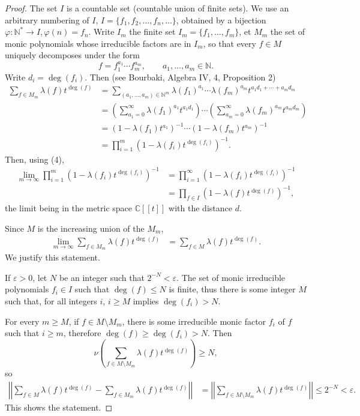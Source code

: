 \documentclass[11pt,a4paper]{article}
\newcommand{\N}{\mathbb{N}}
\newcommand{\C}{\mathbb{C}}
\begin{document}
\begin{proof}
The set $I$ is a countable set (countable union of finite sets). We use an arbitrary numbering of $I$, $I = \{f_1,f_2,\ldots,f_n,\ldots\}$, obtained by a bijection $\varphi : \N^* \to I, \varphi(n) =f_n$. Write $I_m$ the finite set $I_m = \{f_1,\ldots,f_m\}$, et $M_m$ the set of monic polynomials whose irreducible factors are in $I_m$, so that every $f \in M$  uniquely decomposes under the form
$$f = f_1^{a_1}\cdots f_m^{a_m}, \qquad a_1,\ldots,a_m \in \N.$$
Write $d_i = \deg(f_i)$. Then (see Bourbaki, Algebra IV, 4, Proposition 2)
\begin{align*}
\sum_{f \in M_m} \lambda(f) t^{\deg(f)} &= \sum_{(a_1,\ldots,a_m) \in \N^m} \lambda(f_1)^{a_1} \cdots \lambda(f_m)^{a_m} t^{a_1d_1+ \cdots+a_md_m}\\
&= \left(\sum_{a_1 = 0}^\infty \lambda(f_1)^{a_1} t^{a_1d_1} \right) \cdots \left(\sum_{a_m = 0}^\infty \lambda(f_m)^{a_m} t^{a_md_m} \right)\\
&= \left(1 - \lambda(f_1)t^{a_1} \right)^{-1} \cdots  \left(1 - \lambda(f_m)t^{a_m} \right)^{-1}\\
&=\prod_{i=1}^m \left( 1 - \lambda(f_i) t^{\deg(f_i)} \right)^{-1}.
\end{align*}
Then, using (4),
\begin{align*}
\lim_{m \to \infty} \prod_{i=1}^m \left( 1 - \lambda(f_i) t^{\deg(f_i)} \right)^{-1} &=\prod_{i=1}^\infty \left( 1 - \lambda(f_i) t^{\deg(f_i)} \right)^{-1} \\
&=\prod_{f \in I} (1 - \lambda(f) t^{\deg(f)})^{-1},
\end{align*}
the limit being in the metric space $\C[[t]]$ with the distance $d$.

Since $M$ is the increasing union of the $M_m$, 
\begin{align*}
\lim_{m\to \infty} \sum_{f \in M_m} \lambda(f) t^{\deg(f)}  &=  \sum_{f \in M} \lambda(f) t^{\deg(f)}.
\end{align*}
We justify this statement.

 If $\varepsilon >0$, let $N$ be an integer such that $2^{-N} < \varepsilon$. The set of monic irreducible polynomials $f_i \in I$ such that $\deg(f) \leq N$ is finite, thus there is some integer $M$ such that, for all integers $i$, $i \geq M$ implies $\deg(f_i) > N$.
 
 For every $m\geq M$, if $f \in M \setminus M_m$, there is some irreducible monic factor $f_i$ of $f$ such that  $i \geq m$, therefore $\deg(f) \geq \deg(f_i) > N$. Then
 $$\nu  \left(\sum_{f \in M\setminus M_m} \lambda(f) t^{\deg(f)} \right) \geq N,$$
so
 \begin{align*}
 \left | \left |  \sum_{f \in M} \lambda(f) t^{\deg(f)} - \sum_{f \in M_m} \lambda(f) t^{\deg(f)} \right | \right |  &=  \left | \left |  \sum_{f \in M\setminus M_m} \lambda(f) t^{\deg(f)}  \right | \right | \leq 2^{-N} < \varepsilon.
 \end{align*}
 This shows the statement.
 

\end{proof}
\end{document}
